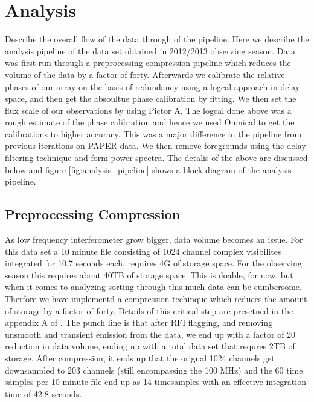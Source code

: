 \documentclass[twocolumn,numberedappendix]{emulateapj}
\begin{document}


\section{Analysis}
Describe the overall flow of the data through of the pipeline.
Here we describe the analysis pipeline of the data set obtained in 2012/2013
observing season. 
Data was first run through a preprocessing compression pipeline which reduces
the volume of the data by a factor of forty. Afterwards we calibrate the
relative phases of our array on the basis of redundancy using a logcal approach
in delay space, and then get the absoultue phase calibration by fitting. We then
set the flux scale of our observations by using Pictor A. The logcal done above
was a rough estimate of the phase calibration and hence we used Omnical to get
the calibrations to higher accuracy. This was a major difference in the pipeline
from previous iterations on PAPER data. We then remove foregrounds using the
delay filtering technique and form power spectra. The detalis of the above are
discussed below and figure \ref{fig:analysis_pipeline} shows a block diagram of
the analysis pipeline.

\subsection{Preprocessing Compression}
As low frequency interferometer grow bigger, data volume becomes an issue. For
this data set a 10 minute file consisting of 1024 channel complex visibilites
integrated for 10.7 seconds each, requires 4G of storage space. For the
observing season this requires about 40TB of storage space. This is doable, for
now, but when it comes to analyzing sorting through this much data can be
cumbersome. Therfore we have implementd a compression techinque which reduces
the amount of storage by a factor of forty. 
Details of this critical step are presetned in the appendix A of
\citep{parsons2014a}.  The punch line is that after RFI flagging, and removing
unsmooth and transient emission from the data, we end up with a factor of 20
reduction in data volume, ending up with a total data set that requres 2TB of
storage. After compression, it ends up that the orignal 1024 channels get
downsampled to 203 channels (still encompassing the 100 MHz) and the 60 time
samples per 10 minute file end up as 14 timesamples with an effective
integration time of 42.8 seconds. 
\end{document}
